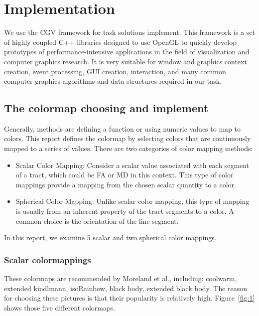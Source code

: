 \documentclass[a4paper, 12pt]{report}
\begin{document}
\chapter{Implementation}

We use the CGV framework for task solutions implement. This framework is a set of highly coupled C++ libraries designed to use OpenGL to quickly develop prototypes of performance-intensive applications in the field of visualization and computer graphics research. It is very suitable for window and graphics context creation, event processing, GUI creation, interaction, and many common computer graphics algorithms and data structures required in our task.

\section{The colormap choosing and implement}
Generally, methods are defining a function or using numeric values to map to colors. This report defines the colormap by selecting colors that are continuously mapped to a series of values. 
There are two categories of color mapping methods:
\begin{itemize}
	\item Scalar Color Mapping: Consider a scalar value associated with each segment of a tract, which could  be FA or MD in this context. This type of color mappings provide a mapping from the chosen scalar quantity to a color. 
	\item Spherical Color Mapping: Unlike scalar color mapping, this type of mapping is usually from an inherent property of the tract segments to a color. A common choice is the orientation of the line segment. 
\end{itemize}

In this report, we examine 5 scalar and two spherical color mappings. 

\subsection*{Scalar colormappings}

These colormaps are recommended by Moreland et al., including: coolwarm, extended kindlmann, isoRainbow, black body, extended black body. The reason for choosing these pictures is that their popularity is relatively high. Figure~\ref{fig:1} shows those five different colormaps.
\end{document}
